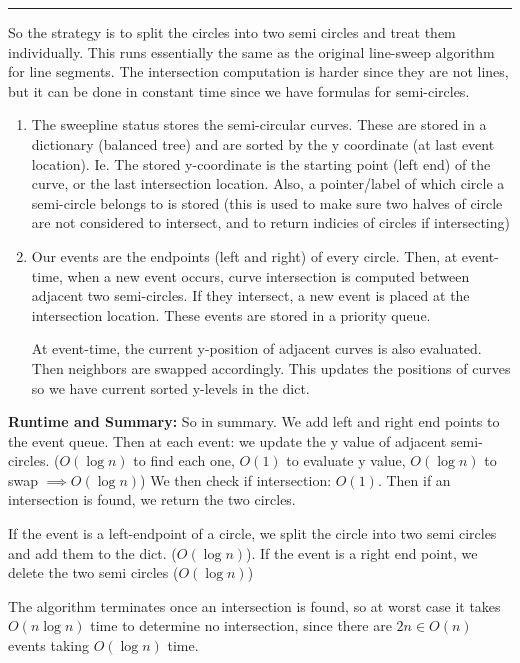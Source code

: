 \documentclass[11pt]{article}
\begin{document}
\hrule


So the strategy is to split the circles into two semi circles and treat them individually.
This runs essentially the same as the original line-sweep algorithm for line segments.
The intersection computation is harder since they are not lines, but it can be done in constant time since we have formulas for semi-circles.

\begin{enumerate}[(1)]
    \item The sweepline status stores the semi-circular curves.
        These are stored in a dictionary (balanced tree) and are sorted by the y coordinate (at last event location).
        Ie. The stored y-coordinate is the starting point (left end) of the curve, or the last intersection location.
        Also, a pointer/label of which circle a semi-circle belongs to is stored 
        (this is used to make sure two halves of circle are not considered to intersect, and to return indicies of circles if intersecting)

    \item Our events are the endpoints (left and right) of every circle. 
    Then, at event-time, when a new event occurs, curve intersection is computed between adjacent 
    two semi-circles. If they intersect, a new event is placed at the intersection location. 
    These events are stored in a priority queue. 

    At event-time, the current y-position of adjacent curves is also evaluated. Then neighbors are swapped accordingly.
    This updates the positions of curves so we have current sorted y-levels in the dict. 
\end{enumerate}


\textbf{Runtime and Summary: }So in summary. We add left and right end points to the event queue. 
Then at each event: we update the y value of adjacent semi-circles. 
($O(\log n)$ to find each one, $O(1)$ to evaluate y value, $O(\log n)$ to swap $\implies O(\log n)$)
We then check if intersection: $O(1)$. Then if an intersection is found, we return the two circles.

If the event is a left-endpoint of a circle, we split the circle into two semi circles and add them to the dict.
($O(\log n)$). If the event is a right end point, we delete the two semi circles ($O(\log n)$)

The algorithm terminates once an intersection is found, so at worst case it takes $O(n \log n)$ time to determine no intersection,
since there are $2n \in O(n)$ events taking $O(\log n)$ time.
\end{document}
